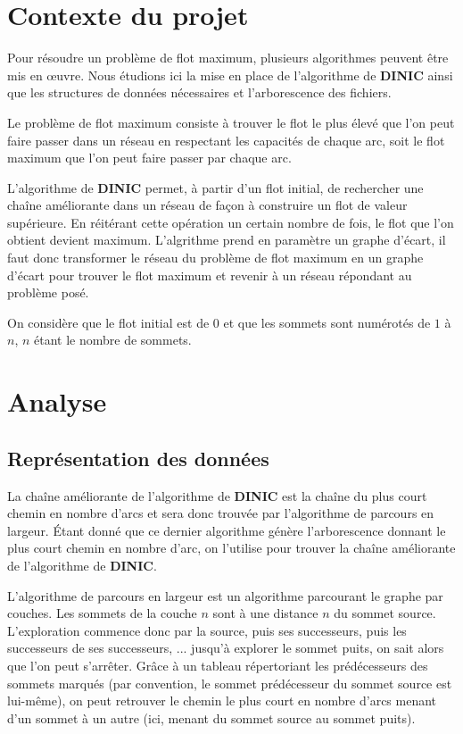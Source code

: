 \documentclass[11pt, a4paper]{report}
\begin{document}
	
	\tableofcontents
	
	
	\chapter{Contexte du projet}
	Pour résoudre un problème de flot maximum, plusieurs algorithmes peuvent être mis en œuvre. Nous étudions ici la mise en place de l'algorithme de \textbf{DINIC} ainsi que les structures de données nécessaires et l'arborescence des fichiers.
	
	Le problème de flot maximum consiste à trouver le flot le plus élevé que l'on peut faire passer dans un réseau en respectant les capacités de chaque arc, soit le flot maximum que l'on peut faire passer par chaque arc.
	
	L'algorithme de \textbf{DINIC} permet, à partir d'un flot initial, de rechercher une chaîne améliorante dans un réseau de façon à construire un flot de valeur supérieure. En réitérant cette opération un certain nombre de fois, le flot que l'on obtient devient maximum. L'algrithme prend en paramètre un graphe d'écart, il faut donc transformer le réseau du problème de flot maximum en un graphe d'écart pour trouver le flot maximum et revenir à un réseau répondant au problème posé.
	
	On considère que le flot initial est de 0 et que les sommets sont numérotés de $1$ à $n$, $n$ étant le nombre de sommets.
	
	
	
	\chapter{Analyse}
	\section{Représentation des données}
	La chaîne améliorante de l'algorithme de \textbf{DINIC} est la chaîne du plus court chemin en nombre d'arcs et sera donc trouvée par l'algorithme de parcours en largeur. Étant donné que ce dernier algorithme génère l'arborescence donnant le plus court chemin en nombre d'arc, on l'utilise pour trouver la chaîne améliorante de l'algorithme de \textbf{DINIC}.
	
	L’algorithme de parcours en largeur est un algorithme parcourant le graphe par couches. Les sommets de la couche $n$ sont à une distance $n$ du sommet source. L’exploration commence donc par la source, puis ses successeurs, puis les successeurs de ses successeurs, ... jusqu’à explorer le sommet puits, on sait alors que l’on peut s’arrêter. Grâce à un tableau répertoriant les prédécesseurs des sommets marqués (par convention, le sommet prédécesseur du sommet source est lui-même), on peut retrouver le chemin le plus court en nombre d'arcs menant d’un sommet à un autre (ici, menant du sommet source au sommet puits).
	
\end{document}

